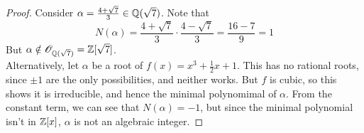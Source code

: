 \begin{proof}
	Consider $\alpha = \frac{4+\sqrt{7}}{3} \in \mathbb{Q}(\sqrt{7})$. Note that
	\[ N(\alpha) = \frac{4+\sqrt{7}}{3} \cdot \frac{4-\sqrt{7}}{3} = \frac{16-7}{9} = 1 \]
	But $\alpha \notin \mathscr{O}_{\mathbb{Q}(\sqrt{7})} = \mathbb{Z}[\sqrt{7}]$. \\
	
	Alternatively, let $\alpha$ be a root of $f(x) = x^3 + \frac{1}{2}x + 1$. This has no rational roots, since $\pm 1$ are the only possibilities, and neither works. But $f$ is cubic, so this shows it is irreducible, and hence the minimal polynomimal of $\alpha$. From the constant term, we can see that $N(\alpha) = -1$, but since the minimal polynomial isn't in $\mathbb{Z}[x]$, $\alpha$ is not an algebraic integer.
\end{proof}
